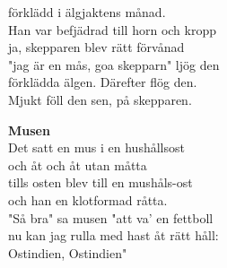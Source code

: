 förklädd i älgjaktens månad.\\
Han var befjädrad till horn och kropp\\
ja, skepparen blev rätt förvånad\\
"jag är en mås, goa skepparn" ljög den\\
förklädda älgen. Därefter flög den.\\
Mjukt föll den sen, på skepparen.\par
\vspace{10pt}
\textbf{Musen}\\
Det satt en mus i en hushållsost\\
och åt och åt utan måtta\\
tills osten blev till en mushåls-ost\\
och han en klotformad råtta.\\
"Så bra" sa musen "att va' en fettboll\\
nu kan jag rulla med hast åt rätt håll:\\
Ostindien, Ostindien"\\

